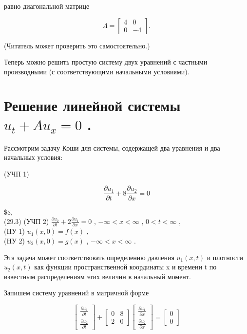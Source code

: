 \documentclass[
  ukrainian,
]{article}
\begin{document}
равно диагональной матрице

\[
\Lambda = \begin{bmatrix} 4 & 0 \\ 0 & -4 \end{bmatrix}.
\]

(Читатель может проверить это самостоятельно.)

Теперь можно решить простую систему двух уравнений с частными
производными (с соответствующими начальными условиями).

\section{\texorpdfstring{Решение линейной системы \(u_t + Au_x = 0\)
.}{Решение линейной системы u\_t + Au\_x = 0 .}}\label{ux440ux435ux448ux435ux43dux438ux435-ux43bux438ux43dux435ux439ux43dux43eux439-ux441ux438ux441ux442ux435ux43cux44b-u_t-au_x-0-.}

Рассмотрим задачу Коши для системы, содержащей два уравнения и два
начальных условия:

(УЧП 1)

\[
\frac{\partial u_1}{\partial t} + 8 \frac{\partial u_2}{\partial x} = 0
\]

\$\$,\\
(29.3) (УЧП 2)
\(\frac{\partial u_2}{\partial t} + 2 \frac{\partial u_1}{\partial x} = 0\)
, \(-\infty < x < \infty\) , \(0 < t < \infty\) ,\\
(HУ 1) \(u_1(x, 0) = f(x)\) ,\\
(HУ 2) \(u_2(x, 0) = g(x)\) , \(-\infty < x < \infty\) .

Эта задача может соответствовать определению давления \(u_1(x, t)\) и
плотности \(u_2(x, t)\) как функции пространственной координаты x и
времени t по известным распределениям этих величин в начальный момент.

Запишем систему уравнений в матричной форме

\[
\begin{bmatrix} \frac{\partial u_1}{\partial t} \\ \frac{\partial u_2}{\partial t} \end{bmatrix} + \begin{bmatrix} 0 & 8 \\ 2 & 0 \end{bmatrix} \begin{bmatrix} \frac{\partial u_1}{\partial x} \\ \frac{\partial u_2}{\partial x} \end{bmatrix} = \begin{bmatrix} 0 \\ 0 \end{bmatrix}
\]
\end{document}
